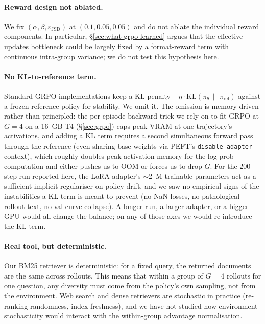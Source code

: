 \documentclass[11pt]{article}
\begin{document}
\paragraph{Reward design not ablated.}
We fix $(\alpha, \beta, \varepsilon_{\mathrm{JSD}})$ at $(0.1, 0.05,
0.05)$ and do not ablate the individual reward components. In
particular, §\ref{sec:what-grpo-learned} argues that the effective-
updates bottleneck could be largely fixed by a format-reward term
with continuous intra-group variance; we do not test this hypothesis
here.

\paragraph{No KL-to-reference term.}
Standard GRPO implementations keep a KL penalty
$-\eta \cdot \mathrm{KL}(\pi_\theta \,\|\, \pi_\mathrm{ref})$ against
a frozen reference policy for stability. We omit it. The omission
is memory-driven rather than principled: the per-episode-backward
trick we rely on to fit GRPO at $G{=}4$ on a 16~GB T4
(§\ref{sec:grpo}) caps peak VRAM at one trajectory's activations,
and adding a KL term requires a second simultaneous forward pass
through the reference (even sharing base weights via PEFT's
\texttt{disable\_adapter} context), which roughly doubles peak
activation memory for the log-prob computation and either pushes
us to OOM or forces us to drop $G$. For the 200-step run reported
here, the LoRA adapter's $\sim$2~M trainable parameters act as a
sufficient implicit regulariser on policy drift, and we saw no
empirical signs of the instabilities a KL term is meant to prevent
(no NaN losses, no pathological rollout text, no val-curve
collapse). A longer run, a larger adapter, or a bigger GPU would
all change the balance; on any of those axes we would re-introduce
the KL term.

\paragraph{Real tool, but deterministic.}
Our BM25 retriever is deterministic: for a fixed query, the
returned documents are the same across rollouts. This means that
within a group of $G{=}4$ rollouts for one question, any diversity
must come from the policy's own sampling, not from the environment.
Web search and dense retrievers are stochastic in practice (re-
ranking randomness, index freshness), and we have not studied how
environment stochasticity would interact with the within-group
advantage normalisation.
\end{document}
